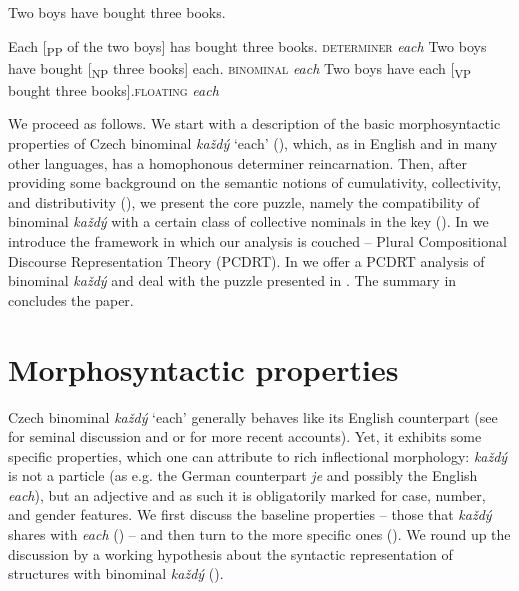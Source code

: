 \documentclass[output=paper,colorlinks,citecolor=brown,newtxmath]{langscibook}
\begin{document}
\ea \label{ex:line41} Two boys have bought three books.
\z

\ea \ea Each [\textsubscript{PP} of the two boys] has bought three books. \label{ex:sec1-two-boys-three-books}
\hfill \textsc{determiner} \textit{each}
\ex \label{ex:two_boys_each} Two boys have bought [\textsubscript{NP} three books]
each.\label{ex:sec1-two-boys-three-beers-each} \hfill \textsc{binominal} \textit{each}
\ex \label{ex:adv-each} Two boys have each [\textsubscript{VP} bought three books].\hfill\textsc{floating} \textit{each}
\z\z

\noindent We proceed as follows. We start with a description of the basic morphosyntactic properties of Czech binominal \textit{každý} `each' (), which, as in English and in many other languages, has a homophonous determiner reincarnation. Then, after providing some background on the semantic notions of cumulativity, collectivity, and distributivity (), we present the core puzzle, namely the compatibility of binominal \textit{každý} with a certain class of collective nominals in the key (). In  we introduce the framework in which our analysis is couched -- Plural Compositional Discourse Representation Theory (PCDRT). In  we offer a PCDRT analysis of binominal \textit{každý} and deal with the puzzle presented in . The summary in  concludes the paper.


\section{Morphosyntactic properties}\label{basic-properties-of-czech-binominal-each-i}

Czech binominal \textit{každý} `each' generally behaves like its English counterpart (see \citealt{Safir1988} for seminal discussion and \citealt{Zimmermann2002} or \citealt{Dotlacil2012} for more recent accounts). Yet, it exhibits some specific properties, which one can attribute to rich inflectional morphology: \textit{každý} is not a particle (as e.g. the German counterpart \textit{je} and possibly the English \textit{each}), but an adjective and as such it is obligatorily marked for case, number, and gender features. We first discuss the baseline properties -- those that \textit{každý} shares with \textit{each} () -- and then turn to the more specific ones (). We round up the discussion by a working hypothesis about the syntactic representation of structures with binominal \textit{každý} ().
\end{document}
